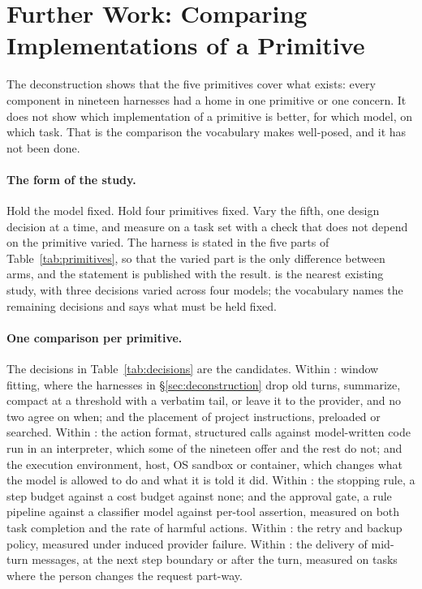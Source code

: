 \section{Further Work: Comparing Implementations of a Primitive}
\label{sec:further}

The deconstruction shows that the five primitives cover what exists: every component in nineteen harnesses had a home in one primitive or one concern. It does not show which implementation of a primitive is better, for which model, on which task. That is the comparison the vocabulary makes well-posed, and it has not been done.

\paragraph{The form of the study.} Hold the model fixed. Hold four primitives fixed. Vary the fifth, one design decision at a time, and measure on a task set with a check that does not depend on the primitive varied. The harness is stated in the five parts of Table~\ref{tab:primitives}, so that the varied part is the only difference between arms, and the statement is published with the result. \citet{fan2026empirical} is the nearest existing study, with three decisions varied across four models; the vocabulary names the remaining decisions and says what must be held fixed.

\paragraph{One comparison per primitive.} The decisions in Table~\ref{tab:decisions} are the candidates. Within : window fitting, where the harnesses in \S\ref{sec:deconstruction} drop old turns, summarize, compact at a threshold with a verbatim tail, or leave it to the provider, and no two agree on when; and the placement of project instructions, preloaded or searched. Within : the action format, structured calls against model-written code run in an interpreter, which some of the nineteen offer and the rest do not; and the execution environment, host, OS sandbox or container, which changes what the model is allowed to do and what it is told it did. Within : the stopping rule, a step budget against a cost budget against none; and the approval gate, a rule pipeline against a classifier model against per-tool assertion, measured on both task completion and the rate of harmful actions. Within : the retry and backup policy, measured under induced provider failure. Within : the delivery of mid-turn messages, at the next step boundary or after the turn, measured on tasks where the person changes the request part-way.

